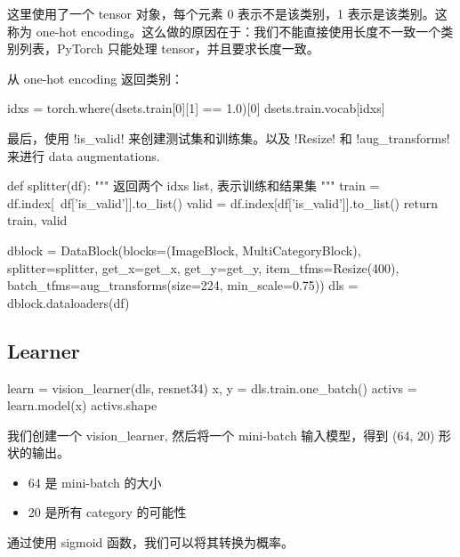 \documentclass{ctexart}
\newenvironment{monos}{\VerbatimEnvironment\begin{pythoncode}}{\end{pythoncode}}
\begin{document}
这里使用了一个 tensor 对象，每个元素 0 表示不是该类别，1 表示是该类别。这称为 one-hot
encoding。这么做的原因在于：我们不能直接使用长度不一致一个类别列表，PyTorch 只能处理
tensor，并且要求长度一致。

从 one-hot encoding 返回类别：

\begin{monos}
idxs = torch.where(dsets.train[0][1] == 1.0)[0]
dsets.train.vocab[idxs]
\end{monos}

最后，使用 \mono!is_valid! 来创建测试集和训练集。以及 \mono!Resize! 和
\mono!aug_transforms! 来进行 data augmentations.

\begin{monos}
def splitter(df):
    """
    返回两个 idxs list, 表示训练和结果集
    """
    train = df.index[~df['is_valid']].to_list()
    valid = df.index[df['is_valid']].to_list()
    return train, valid

dblock = DataBlock(blocks=(ImageBlock, MultiCategoryBlock),
                  splitter=splitter,
                  get_x=get_x,
                  get_y=get_y,
                  item_tfms=Resize(400),
                  batch_tfms=aug_transforms(size=224, min_scale=0.75))
dls = dblock.dataloaders(df)
\end{monos}

\subsection{Learner}

\begin{monos}
    learn = vision_learner(dls, resnet34)
    x, y = dls.train.one_batch()
    activs = learn.model(x)
    activs.shape
\end{monos}

我们创建一个 vision\_learner, 然后将一个 mini-batch 输入模型，得到 (64, 20) 形状的输出。

\begin{itemize}
    \item 64 是 mini-batch 的大小
    \item 20 是所有 category 的可能性
\end{itemize}

通过使用 sigmoid 函数，我们可以将其转换为概率。
\end{document}
